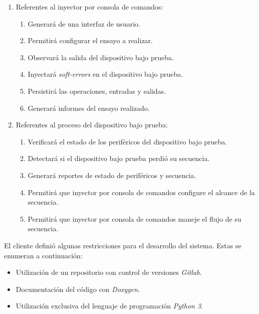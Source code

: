 \begin{enumerate}
	\item Referentes al inyector por consola de comandos:
		\begin{enumerate}
			\item Generará de una interfaz de usuario.
			\item Permitirá configurar el ensayo a realizar.
			\item Observará la salida del dispositivo bajo prueba.
            \item Inyectará \emph{soft-errors} en el dispositivo bajo prueba.
			\item Persistirá las operaciones, entradas y salidas.
			\item Generará informes del ensayo realizado.
		\end{enumerate}
	\item Referentes al proceso del dispositivo bajo prueba:
		\begin{enumerate}
			\item Verificará el estado de los periféricos del dispositivo bajo prueba.
			\item Detectará si el dispositivo bajo prueba perdió su secuencia.
			\item Generará reportes de estado de periféricos y secuencia.
			\item Permitirá que inyector por consola de comandos configure el alcance de la secuencia.
			\item Permitirá que inyector por consola de comandos maneje el flujo de su secuencia.
		\end{enumerate}
\end{enumerate}

El cliente definió algunas restricciones para el desarrollo del sistema.
Estas se enumeran a continuación:

\begin{itemize}
	\item Utilización de un repositorio con control de versiones \emph{Gitlab}.
	\item Documentación del código con \emph{Doxygen}.
	\item Utilización exclusiva del lenguaje de programación \emph{Python 3}.
\end{itemize}

